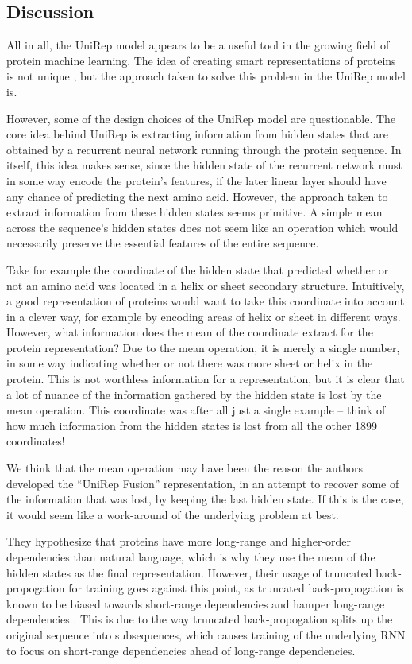 \documentclass[a4paper,12pt]{article}
\begin{document}
\subsection{Discussion}
\label{section:unirep_discussion}
All in all, the UniRep model appears to be a useful tool in the growing field of protein machine learning. The idea of creating smart representations of proteins is not unique \cite{proteinrepblog}, but the approach taken to solve this problem in the UniRep model is.

However, some of the design choices of the UniRep model are questionable. The core idea behind UniRep is extracting information from hidden states that are obtained by a recurrent neural network running through the protein sequence. In itself, this idea makes sense, since the hidden state of the recurrent network must in some way encode the protein's features, if the later linear layer should have any chance of predicting the next amino acid. However, the approach taken to extract information from these hidden states seems primitive. A simple mean across the sequence's hidden states does not seem like an operation which would necessarily preserve the essential features of the entire sequence.

Take for example the coordinate of the hidden state that predicted whether or not an amino acid was located in a helix or sheet secondary structure. Intuitively, a good representation of proteins would want to take this coordinate into account in a clever way, for example by encoding areas of helix or sheet in different ways. However, what information does the mean of the coordinate extract for the protein representation? Due to the mean operation, it is merely a single number, in some way indicating whether or not there was more sheet or helix in the protein. This is not worthless information for a representation, but it is clear that a lot of nuance of the information gathered by the hidden state is lost by the mean operation. This coordinate was after all just a single example -- think of how much information from the hidden states is lost from all the other 1899 coordinates!

We think that the mean operation may have been the reason the authors developed the ``UniRep Fusion'' representation, in an attempt to recover some of the information that was lost, by keeping the last hidden state. If this is the case, it would seem like a work-around of the underlying problem at best.

They hypothesize that proteins have more long-range and higher-order dependencies than natural language, which is why they use the mean of the hidden states as the final representation. However, their usage of truncated back-propogation for training goes against this point, as truncated back-propogation is known to be biased towards short-range dependencies and hamper long-range dependencies \cite{tallec2017unbiasing}. This is due to the way truncated back-propogation splits up the original sequence into subsequences, which causes training of the underlying RNN to focus on short-range dependencies ahead of long-range dependencies.
\end{document}
